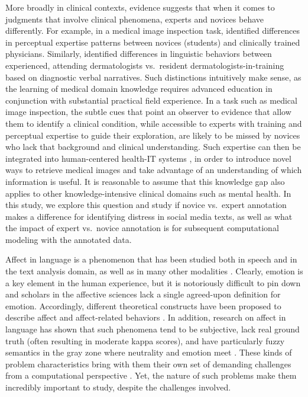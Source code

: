 \documentclass[11pt]{article}
\begin{document}
More broadly in clinical contexts, evidence suggests that when it comes to judgments that involve clinical phenomena, experts and novices behave differently. For example, in a medical image inspection task,  identified differences in perceptual expertise patterns between novices (students) and clinically trained physicians. Similarly,  identified  differences in linguistic behaviors between experienced, attending dermatologists vs.\ resident dermatologists-in-training based on diagnostic verbal narratives. Such distinctions intuitively make sense, as the learning of medical domain knowledge requires advanced education in conjunction with substantial practical field experience. In a task such as medical image inspection, the subtle cues that point an observer to evidence that allow them to identify a clinical condition, while accessible to experts with training and perceptual expertise to guide their exploration, are likely to be missed by novices who lack that background and clinical understanding. Such expertise can then be integrated into human-centered health-IT systems \cite{guo2014infusing}, in order to introduce novel ways to retrieve medical images and take advantage of an understanding of which information is useful. It is reasonable to assume that this knowledge gap also applies to other knowledge-intensive clinical domains such as mental health. In this study, we explore this question and study if novice vs.\ expert annotation makes a difference for identifying distress in social media texts, as well as what the impact of expert vs.\ novice annotation is for subsequent computational modeling with the annotated data.


Affect in language is a phenomenon that has been studied both in speech and in the text analysis domain, as well as in many other modalities \cite{calvodmello2010}. Clearly, emotion is a key element in the human experience, but it is notoriously difficult to pin down and scholars in the affective sciences lack a single agreed-upon definition for emotion. Accordingly, different theoretical constructs have been proposed to describe affect and affect-related behaviors \cite{picard1997}. In addition, research on affect in language has shown that such phenomena tend to be subjective, lack real ground truth (often resulting in moderate kappa scores), and have particularly fuzzy semantics in the gray zone where neutrality and emotion meet \cite{alm08}. These kinds of problem characteristics bring with them their own set of demanding challenges from a computational perspective \cite{alm2011}. Yet, the nature of such problems make them incredibly important to study, despite the challenges involved. 
\end{document}
